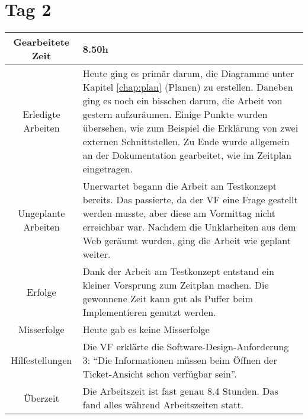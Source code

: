 \section{Tag 2}
\begin{tabularx}{\textwidth}[H]{|c|X|}
  \hline
  Gearbeitete Zeit & 8.50h \\ \hline
  Erledigte Arbeiten & Heute ging es primär darum, die Diagramme unter Kapitel \ref{chap:plan}
  (Planen) zu erstellen. Daneben ging es noch ein bisschen darum, die Arbeit von gestern
  aufzuräumen. Einige Punkte wurden übersehen, wie zum Beispiel die Erklärung von zwei
  externen Schnittstellen. Zu Ende wurde allgemein an der Dokumentation gearbeitet, wie
  im Zeitplan eingetragen. \\ \hline
  Ungeplante Arbeiten & Unerwartet begann die Arbeit am Testkonzept bereits. Das passierte,
  da der VF eine Frage gestellt werden musste, aber diese am Vormittag nicht erreichbar war. Nachdem
  die Unklarheiten aus dem Web geräumt wurden, ging die Arbeit wie geplant weiter.
  \\ \hline
  Erfolge & Dank der Arbeit am Testkonzept entstand ein kleiner Vorsprung zum
  Zeitplan machen. Die gewonnene Zeit kann gut als Puffer beim Implementieren genutzt werden.
  \\ \hline
  Misserfolge & Heute gab es keine Misserfolge \\ \hline
  Hilfestellungen & Die VF erklärte die Software-Design-Anforderung 3: \enquote{Die 
  Informationen müssen beim Öffnen der Ticket-Ansicht schon verfügbar sein}.  \\ \hline
  Überzeit & Die Arbeitszeit ist fast genau 8.4 Stunden. Das fand alles während Arbeitszeiten statt. \\ \hline
\end{tabularx}

\newpage

